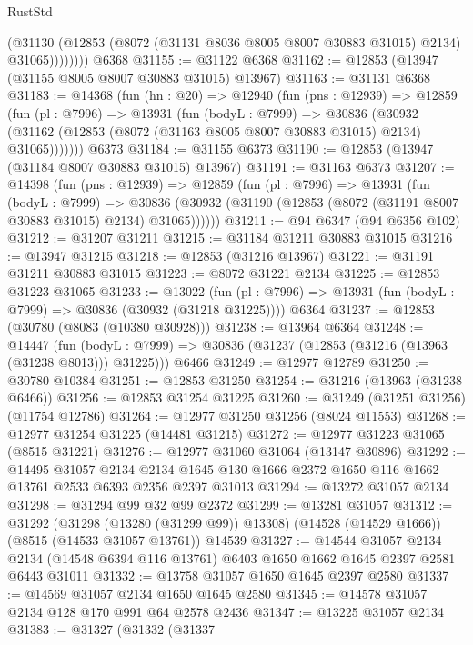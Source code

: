 \begin{lexlean}{RustStd}
\begin{coremodule}
                (@31130
                  (@12853 (@8072 (@31131 @8036 @8005 @8007 @30883 @31015) @2134) @31065))))))))
    @6368
@31155 := @31122 @6368
@31162 := @12853 (@13947 (@31155 @8005 @8007 @30883 @31015) @13967)
@31163 := @31131 @6368
@31183 := @14368
    (fun (hn : @20) =>
    @12940
      (fun (pns : @12939) =>
      @12859
        (fun (pl : @7996) =>
        @13931
          (fun (bodyL : @7999) =>
          @30836
            (@30932 (@31162 (@12853 (@8072 (@31163 @8005 @8007 @30883 @31015) @2134) @31065)))))))
    @6373
@31184 := @31155 @6373
@31190 := @12853 (@13947 (@31184 @8007 @30883 @31015) @13967)
@31191 := @31163 @6373
@31207 := @14398
    (fun (pns : @12939) =>
    @12859
      (fun (pl : @7996) =>
      @13931
        (fun (bodyL : @7999) =>
        @30836 (@30932 (@31190 (@12853 (@8072 (@31191 @8007 @30883 @31015) @2134) @31065))))))
@31211 := @94 @6347 (@94 @6356 @102)
@31212 := @31207 @31211
@31215 := @31184 @31211 @30883 @31015
@31216 := @13947 @31215
@31218 := @12853 (@31216 @13967)
@31221 := @31191 @31211 @30883 @31015
@31223 := @8072 @31221 @2134
@31225 := @12853 @31223 @31065
@31233 := @13022
    (fun (pl : @7996) => @13931 (fun (bodyL : @7999) => @30836 (@30932 (@31218 @31225))))
    @6364
@31237 := @12853 (@30780 (@8083 (@10380 @30928)))
@31238 := @13964 @6364
@31248 := @14447
    (fun (bodyL : @7999) => @30836 (@31237 (@12853 (@31216 (@13963 (@31238 @8013))) @31225)))
    @6466
@31249 := @12977 @12789
@31250 := @30780 @10384
@31251 := @12853 @31250
@31254 := @31216 (@13963 (@31238 @6466))
@31256 := @12853 @31254 @31225
@31260 := @31249 (@31251 @31256) (@11754 @12786)
@31264 := @12977 @31250 @31256 (@8024 @11553)
@31268 := @12977 @31254 @31225 (@14481 @31215)
@31272 := @12977 @31223 @31065 (@8515 @31221)
@31276 := @12977 @31060 @31064 (@13147 @30896)
@31292 := @14495
    @31057
    @2134
    @2134
    @1645
    @130
    @1666
    @2372
    @1650
    @116
    @1662
    @13761
    @2533
    @6393
    @2356
    @2397
    @31013
@31294 := @13272 @31057 @2134
@31298 := @31294 @99 @32 @99 @2372
@31299 := @13281 @31057
@31312 := @31292
    (@31298 (@13280 (@31299 @99)) @13308)
    (@14528 (@14529 @1666))
    (@8515 (@14533 @31057 @13761))
    @14539
@31327 := @14544
    @31057
    @2134
    @2134
    (@14548 @6394 @116 @13761)
    @6403
    @1650
    @1662
    @1645
    @2397
    @2581
    @6443
    @31011
@31332 := @13758 @31057 @1650 @1645 @2397 @2580
@31337 := @14569 @31057 @2134 @1650 @1645 @2580
@31345 := @14578 @31057 @2134 @128 @170 @991 @64 @2578 @2436
@31347 := @13225 @31057 @2134
@31383 := @31327
    (@31332
      (@31337

\end{coremodule}
\end{lexlean}
